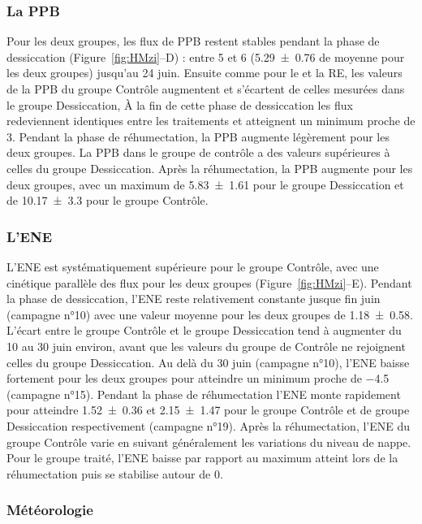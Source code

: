 \subsubsection{La PPB}

Pour les deux groupes, les flux de PPB restent stables pendant la phase de dessiccation (Figure~\ref{fig:HMzi}--D) :
entre 5 et \SI{6}{\uml} (\SI{5.29(076)}{\uml} de moyenne pour les deux groupes) jusqu'au 24 juin.
Ensuite comme pour le \chh et la RE, les valeurs de la PPB du groupe Contrôle augmentent et s'écartent de celles mesurées dans le groupe Dessiccation,
À la fin de cette phase de dessiccation les flux redeviennent identiques entre les traitements et atteignent un minimum proche de \SI{3}{\uml}.
Pendant la phase de réhumectation, la PPB augmente légèrement pour les deux groupes.
La PPB dans le groupe de contrôle a des valeurs supérieures à celles du groupe Dessiccation.
Après la réhumectation, la PPB augmente pour les deux groupes, avec un maximum de \SI{5.83(161)}{\uml} pour le groupe Dessiccation et de \SI{10.17(330)}{\uml} pour le groupe Contrôle.

\subsubsection{L'ENE}

L'ENE est systématiquement supérieure pour le groupe Contrôle, avec une cinétique parallèle des flux pour les deux groupes (Figure~\ref{fig:HMzi}--E).
Pendant la phase de dessiccation, l'ENE reste relativement constante jusque fin juin (campagne n°10) avec une valeur moyenne pour les deux groupes de \SI{1.18(058)}{\uml}.
L'écart entre le groupe Contrôle et le groupe Dessiccation tend à augmenter du 10 au 30 juin environ, avant que les valeurs du groupe de Contrôle ne rejoignent celles du groupe Dessiccation.
Au delà du 30 juin (campagne n°10), l'ENE baisse fortement pour les deux groupes pour atteindre un minimum proche de \SI{-4.5}{\uml} (campagne n°15).
Pendant la phase de réhumectation l'ENE monte rapidement pour atteindre \num{1.52(036)} et \SI{2.15(147)}{\uml} pour le groupe Contrôle et de groupe Dessiccation respectivement (campagne n°19).
Après la réhumectation, l'ENE du groupe Contrôle varie en suivant généralement les variations du niveau de nappe.
Pour le groupe traité, l'ENE baisse par rapport au maximum atteint lors de la réhumectation puis se stabilise autour de 0.

\subsubsection{Météorologie}

